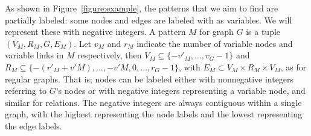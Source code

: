 \documentclass[letterpaper]{article} %
\begin{document}
As shown in Figure~\ref{figure:example}, the patterns that we aim to find are partially labeled: some nodes and edges are labeled with as variables. We will represent these with negative integers. A pattern $M$ for graph $G$ is a tuple $(V_M, R_M, G, E_M)$. Let $v_M$ and $r_M$ indicate the number of variable nodes and variable links in $M$ respectively, then $V_M \subseteq \{-v'_M, \ldots, v_G-1\}$ and $R_M \subseteq \{-(r'_M+v'M), \ldots,-v'M, 0,\ldots, r_G-1\}$, with $E_M \subset V_M \times R_M \times V_M$, as for regular graphs. That is; nodes can be labeled either with nonnegative integers referring to $G$'s nodes or with negative integers representing a variable node, and similar for relations. The negative integers are always contiguous within a single graph, with the highest representing the node labels and the lowest representing the edge labels.
\end{document}

